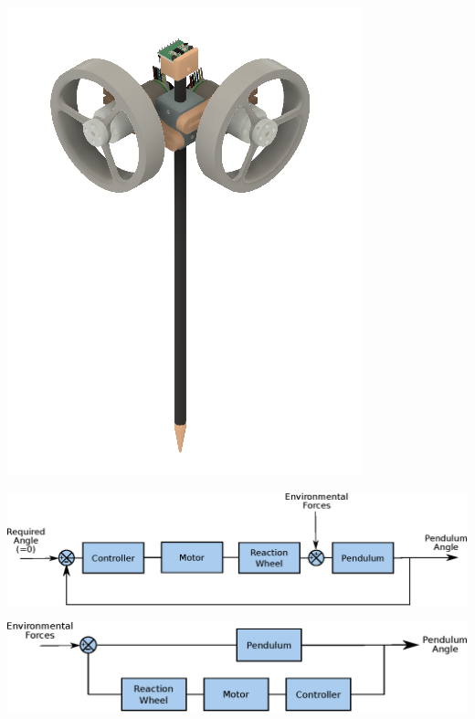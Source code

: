 \documentclass[12pt,letterpaper]{article}
\begin{document}
\includegraphics[width=\textwidth]{images/pencil.png} 
    \label{sketchOfPendulum}
   
\includegraphics[width=\textwidth]{images/basicControl.eps}
    \label{basicControl}

\includegraphics[width=\textwidth]{images/regulator.eps}
    \label{fig.regulatorControlSystem}
\end{document}

